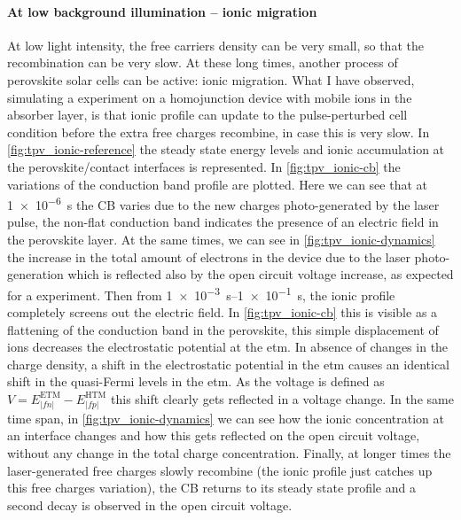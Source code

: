 	\paragraph{At low background illumination -- ionic migration}\label{tpv_biexp_lowlight_ions}
	At low light intensity, the free carriers density can be very small, so that the recombination can be very slow.
	At these long times, another process of perovskite solar cells can be active: ionic migration.
	What I have observed, simulating a  experiment on a homojunction device with mobile ions in the absorber layer, is that ionic profile can update to the pulse\hyp{}perturbed cell condition before the extra free charges recombine, in case this is very slow.
	In \cref{fig:tpv_ionic-reference} the steady state energy levels and ionic accumulation at the perovskite/contact interfaces is represented.
	In \cref{fig:tpv_ionic-cb} the variations of the conduction band profile are plotted.
	Here we can see that at \SI{1e-6}{s} the CB varies due to the new charges photo\hyp{}generated by the laser pulse, the non-flat conduction band indicates the presence of an electric field in the perovskite layer.
	At the same times, we can see in \cref{fig:tpv_ionic-dynamics} the increase in the total amount of electrons in the device due to the laser photo-generation which is reflected also by the open circuit voltage increase, as expected for a  experiment.
	Then from \SIrange{1e-3}{1e-1}{s}, the ionic profile completely screens out the electric field.
	In \cref{fig:tpv_ionic-cb} this is visible as a flattening of the conduction band in the perovskite, this simple displacement of ions decreases the electrostatic potential at the \gls{etm}.
	In absence of changes in the charge density, a shift in the electrostatic potential in the \gls{etm} causes an identical shift in the quasi-Fermi levels in the \gls{etm}.
	As the voltage is defined as $V = E_|fn|^{\mathrm{ETM}} - E_|fp|^{\mathrm{HTM}}$ this shift clearly gets reflected in a voltage change.
	In the same time span, in \cref{fig:tpv_ionic-dynamics} we can see how the ionic concentration at an interface changes and how this gets reflected on the open circuit voltage, without any change in the total charge concentration. 
	Finally, at longer times the laser\hyp{}generated free charges slowly recombine (the ionic profile just catches up this free charges variation), the CB returns to its steady state profile and a second decay is observed in the open circuit voltage.
